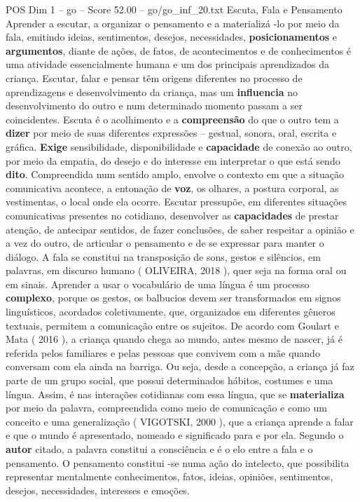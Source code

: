 \begin{textsample}{POS Dim 1 – go – Score 52.00 – go/go\_inf\_20.txt}
Escuta, Fala e Pensamento Aprender a escutar, a organizar o pensamento e a materializá -lo por meio da fala, emitindo ideias, sentimentos, desejos, necessidades, \textbf{posicionamentos} e \textbf{argumentos}, diante de ações, de fatos, de acontecimentos e de conhecimentos é uma atividade essencialmente humana e um dos principais aprendizados da criança.
Escutar, falar e pensar têm origens diferentes no processo de aprendizagens e desenvolvimento da criança, mas um \textbf{influencia} no desenvolvimento do outro e num determinado momento passam a ser coincidentes.
Escuta é o acolhimento e a \textbf{compreensão} do que o outro tem a \textbf{dizer} por meio de suas diferentes expressões – gestual, sonora, oral, escrita e gráfica. \textbf{Exige} sensibilidade, disponibilidade e \textbf{capacidade} de conexão ao outro, por meio da empatia, do desejo e do interesse em interpretar o que está sendo \textbf{dito}.
Compreendida num sentido amplo, envolve o contexto em que a situação comunicativa acontece, a entonação de \textbf{voz}, os olhares, a postura corporal, as vestimentas, o local onde ela ocorre.
Escutar pressupõe, em diferentes situações comunicativas presentes no cotidiano, desenvolver as \textbf{capacidades} de prestar atenção, de antecipar sentidos, de fazer conclusões, de saber respeitar a opinião e a vez do outro, de articular o pensamento e de se expressar para manter o diálogo.
A fala se constitui na transposição de sons, gestos e silêncios, em palavras, em discurso humano ( OLIVEIRA, 2018 ), quer seja na forma oral ou em sinais.
Aprender a usar o vocabulário de uma língua é um processo \textbf{complexo}, porque os gestos, os balbucios devem ser transformados em signos linguísticos, acordados coletivamente, que, organizados em diferentes gêneros textuais, permitem a comunicação entre os sujeitos.
De acordo com Goulart e Mata ( 2016 ), a criança quando chega ao mundo, antes mesmo de nascer, já é referida pelos familiares e pelas pessoas que convivem com a mãe quando conversam com ela ainda na barriga.
Ou seja, desde a concepção, a criança já faz parte de um grupo social, que possui determinados hábitos, costumes e uma língua.
Assim, é nas interações cotidianas com essa língua, que se \textbf{materializa} por meio da palavra, compreendida como meio de comunicação e como um conceito e uma generalização ( VIGOTSKI, 2000 ), que a criança aprende a falar e que o mundo é apresentado, nomeado e significado para e por ela.
Segundo o \textbf{autor} citado, a palavra constitui a consciência e é o elo entre a fala e o pensamento.
O pensamento constitui -se numa ação do intelecto, que possibilita representar mentalmente conhecimentos, fatos, ideias, opiniões, sentimentos, desejos, necessidades, interesses e emoções.

\end{textsample}
